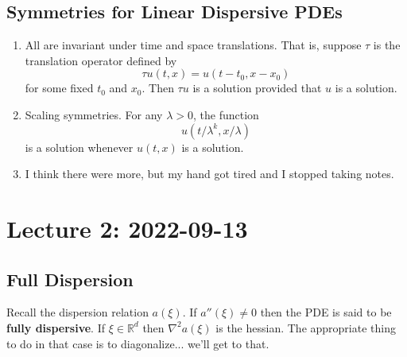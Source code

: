 \documentclass{article}
\def\R{\mathbb{R}} %
\begin{document}
\subsection{Symmetries for Linear Dispersive PDEs}
\begin{enumerate}
  \item All are invariant under time and space translations. That is, suppose
  $\tau$ is the translation operator defined by
  \begin{equation*}
    \tau u(t,x) = u(t-t_{0},x-x_{0})
  \end{equation*}
  for some fixed $t_{0}$ and $x_{0}$. Then $\tau u$ is a solution provided that
  $u$ is a solution. 
  \item Scaling symmetries. For any $\lambda>0$,  the function
  \begin{equation*}
    u(t/\lambda^{k},x/\lambda)
  \end{equation*}
  is a solution whenever $u(t,x)$ is a solution.
  \item I think there were more, but my hand got tired and I stopped taking notes.
\end{enumerate}

\section{Lecture 2: 2022-09-13}
\subsection{Full Dispersion}
Recall the dispersion relation $a(\xi)$. If $a''(\xi) \neq 0$ then the PDE is
said to be \textbf{fully dispersive}. If $\xi\in \R^{d}$ then $\nabla^{2}a(\xi)$
is the hessian. The appropriate thing to do in that case is to diagonalize...
we'll get to that.
\end{document}
